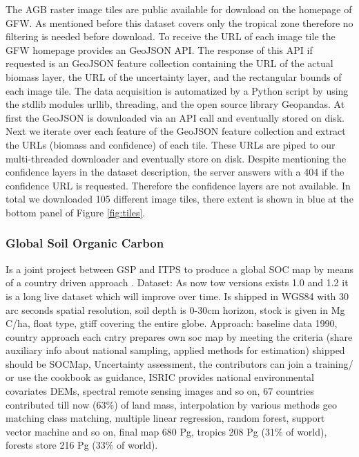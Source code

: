 			The \ac{AGB} raster image tiles are public available for download on the homepage of \ac{GFW}. As mentioned before this dataset covers only the tropical zone therefore no filtering is needed before download. To receive the \ac{URL} of each image tile the \ac{GFW} homepage provides an \ac{GeoJSON} \ac{API}. The response of this \ac{API} if requested is an \ac{GeoJSON} feature collection containing the \ac{URL} of the actual biomass layer, the \ac{URL} of the uncertainty layer, and the rectangular bounds of each image tile. The data acquisition is automatized by a Python script by using the \ac{stdlib} modules urllib, threading, and the open source library Geopandas. At first the \ac{GeoJSON} is downloaded via an \ac{API} call and eventually stored on disk. Next we iterate over each feature of the \ac{GeoJSON} feature collection and extract the \ac{URL}s (biomass and confidence) of each tile. These \ac{URL}s are piped to our multi-threaded downloader and eventually store on disk. Despite mentioning the confidence layers in the dataset description, the server answers with a 404 if the confidence \ac{URL} is requested. Therefore the confidence layers are not available. In total we downloaded 105 different image tiles, there extent is shown in blue at the bottom panel of Figure \ref{fig:tiles}.

		\subsubsection{Global Soil Organic Carbon}
			Is a joint project between \ac{GSP} and \ac{ITPS} to produce a global \ac{SOC} map by means of a country driven approach \citep{FAO2018}. Dataset: As now tow versions exists 1.0 and 1.2 it is a long live dataset which will improve over time. Is shipped in WGS84 with 30 arc seconds spatial resolution, soil depth is 0-30cm horizon, stock is given in Mg C/ha, float type, gtiff covering the entire globe. Approach: baseline data 1990, country approach each cntry prepares own soc map by meeting the criteria (share auxiliary info about national sampling, applied methods for estimation) shipped should be SOCMap, Uncertainty assessment, the contributors can join a training/ or use the cookbook as guidance, ISRIC provides national environmental covariates DEMs, spectral remote sensing images and so on, 67 countries contributed till now (63\%) of land mass, interpolation by various methods geo matching class matching, multiple linear regression, random forest, support vector machine and so on, final map 680 Pg, tropics 208 Pg (31\% of world), forests store 216 Pg (33\% of world).

